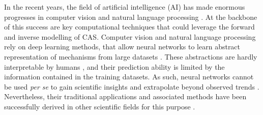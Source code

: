 In the recent years, the field of artificial intelligence (AI) has made enormous progresses in computer vision \cite{XXX} and natural language processing \cite{XXX}. At the backbone of this success are key computational techniques that could leverage the forward and inverse modelling of CAS.
% 
% 
% 
% 
% 
Computer vision and natural language processing rely on deep learning methods, that allow neural networks to learn abstract representation of mechanisms from large datasets \cite{LeCun2015}.
% 
These abstractions are hardly interpretable by humans \cite{XXX}, and their prediction ability is limited by the information contained in the training datasets. As such, neural networks cannot be used \textit{per se} to gain scientific insights and extrapolate beyond observed trends \cite{Barnosky2012,Urban2016}. %
% 
Nevertheless, their traditional applications and associated methods have been successfully derived in other scientific fields for this purpose \cite{Kashinath2021,Schneider2017,Yazdani2020,Rolnick2023}.

